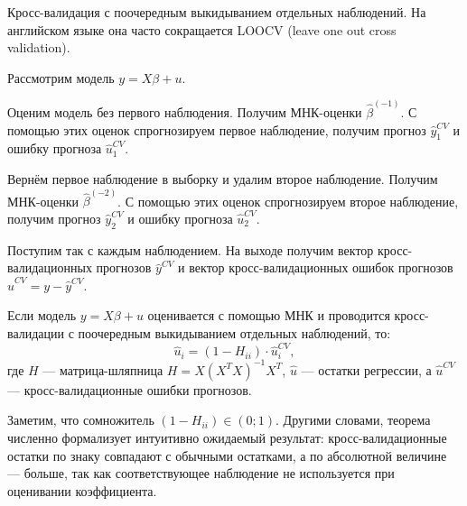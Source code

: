 \documentclass[12pt]{article}
\newcommand{\hb}{\hat{\beta}}
\begin{document}
\begin{definition}[LOOCV]
Кросс-валидация с поочередным выкидыванием отдельных наблюдений. 
На английском языке она часто сокращается LOOCV (leave one out cross validation).

Рассмотрим модель $y=X\beta + u$. 

Оценим модель без первого наблюдения. Получим МНК-оценки $\hb^{(-1)}$.
С помощью этих оценок спрогнозируем первое наблюдение, получим прогноз $\hat y_1^{CV}$ и ошибку прогноза $\hat u_1^{CV}$.

Вернём первое наблюдение в выборку и удалим второе наблюдение. Получим МНК-оценки $\hb^{(-2)}$.
С помощью этих оценок спрогнозируем второе наблюдение, получим прогноз $\hat y_2^{CV}$ и ошибку прогноза $\hat u_2^{CV}$.

Поступим так с каждым наблюдением. На выходе получим вектор кросс-валидационных прогнозов $\hat y^{CV}$ и вектор кросс-валидационных ошибок прогнозов $\hat u^{CV} = y - \hat y^{CV}$.    
\end{definition}

\begin{theorem}
Если модель $y=X\beta + u$ оценивается с помощью МНК и проводится кросс-валидации с поочередным выкидыванием отдельных наблюдений, то:
\[
\hat u_i = (1 - H_{ii}) \cdot \hat u_i^{CV},
\]
где $H$ — матрица-шляпница $H = X(X^TX)^{-1}X^T$, $\hat u$ — остатки регрессии, а $\hat u^{CV}$ — кросс-валидационные ошибки прогнозов.
\end{theorem}

Заметим, что сомножитель $(1 - H_{ii}) \in (0;1)$. 
Другими словами, теорема численно формализует интуитивно ожидаемый результат: кросс-валидационные остатки по знаку совпадают с обычными остатками, а по абсолютной величине — больше, так как соответствующее наблюдение не используется при оценивании коэффициента. 
\end{document}
